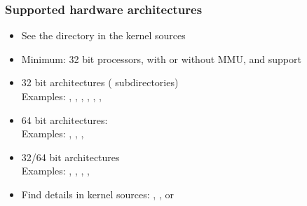 \begin{frame}
  \frametitle{Supported hardware architectures}
  \begin{itemize}
  \item See the  directory in the kernel sources
  \item Minimum: 32 bit processors, with or without MMU, and
     support
  \item 32 bit architectures ( subdirectories)\\
    Examples: , ,
    , , ,
    , 
  \item 64 bit architectures:\\
    Examples: , , ,
  \item 32/64 bit architectures\\
    Examples: , , ,
              , 
  \item Find details in kernel sources: ,
    , or 
  \end{itemize}
\end{frame}
